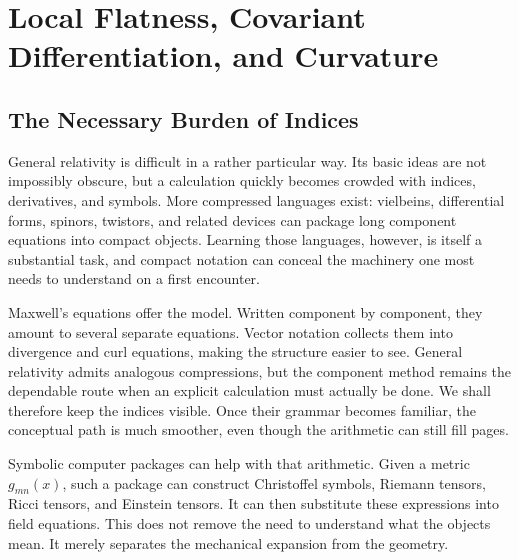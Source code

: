 \chapter{Local Flatness, Covariant Differentiation, and Curvature}


\section{The Necessary Burden of Indices}

General relativity is difficult in a rather particular way. Its basic
ideas are not impossibly obscure, but a calculation quickly becomes
crowded with indices, derivatives, and symbols. More compressed
languages exist: vielbeins, differential forms, spinors, twistors, and
related devices can package long component equations into compact
objects. Learning those languages, however, is itself a substantial
task, and compact notation can conceal the machinery one most needs to
understand on a first encounter.

Maxwell's equations offer the model. Written component by component,
they amount to several separate equations. Vector notation collects
them into divergence and curl equations, making the structure easier
to see. General relativity admits analogous compressions, but the
component method remains the dependable route when an explicit
calculation must actually be done. We shall therefore keep the
indices visible. Once their grammar becomes familiar, the conceptual
path is much smoother, even though the arithmetic can still fill
pages.

Symbolic computer packages can help with that arithmetic. Given a
metric \(g_{mn}(x)\), such a package can construct Christoffel symbols,
Riemann tensors, Ricci tensors, and Einstein tensors. It can then
substitute these expressions into field equations. This does not
remove the need to understand what the objects mean. It merely
separates the mechanical expansion from the geometry.

